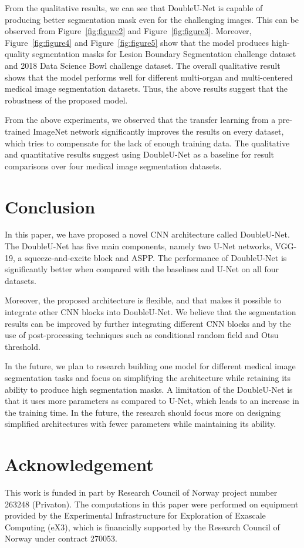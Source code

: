 \documentclass[conference]{IEEEtran}
\begin{document}
From the qualitative results, we can see that DoubleU-Net is capable of producing better segmentation mask even for the challenging images. This can be observed from Figure~\ref{fig:figure2} and Figure~\ref{fig:figure3}. Moreover, Figure~\ref{fig:figure4} and Figure~\ref{fig:figure5} show that the model produces high-quality segmentation masks for Lesion Boundary Segmentation challenge dataset and 2018 Data Science Bowl challenge dataset. The overall qualitative result shows that the model performs well for different multi-organ and multi-centered medical image segmentation datasets. Thus, the above results suggest that the robustness of the proposed model. 

From the above experiments, we observed that the transfer learning from a pre-trained ImageNet network significantly improves the results on every dataset, which tries to compensate for the lack of enough training data. The qualitative and quantitative results suggest using DoubleU-Net as a baseline for result comparisons over four medical image segmentation datasets. 


\section{Conclusion}
\label{sec:conclusion}
In this paper, we have proposed a novel \ac{CNN} architecture called DoubleU-Net. The DoubleU-Net has five main components, namely two U-Net networks, VGG-19, a squeeze-and-excite block and \ac{ASPP}. The performance of DoubleU-Net is significantly better when compared with the baselines and U-Net on all four datasets.

Moreover, the proposed architecture is flexible, and that makes it possible to integrate other \ac{CNN} blocks into DoubleU-Net. We believe that the segmentation results can be improved by further integrating different \ac{CNN} blocks and by the use of post-processing techniques such as conditional random field and Otsu threshold. 

In the future, we plan to research building one model for different medical image segmentation tasks and focus on simplifying the architecture while retaining its ability to produce high segmentation masks. A limitation of the DoubleU-Net is that it uses more parameters as compared to U-Net, which leads to an increase in the training time. In the future, the research should focus more on designing simplified architectures with fewer parameters while maintaining its ability. 
\section*{Acknowledgement}
This work is funded in part by Research Council of Norway project number 263248 (Privaton). The computations in this paper were performed on equipment provided by the Experimental Infrastructure for Exploration of Exascale Computing (eX3), which is financially supported by the Research Council of Norway under contract 270053.


 
\end{document}
